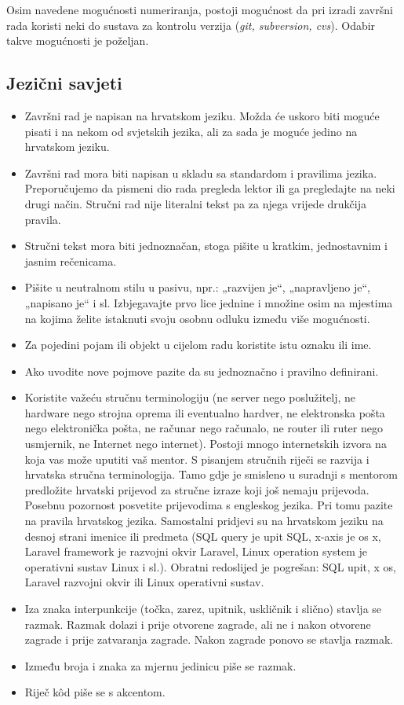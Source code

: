 Osim navedene mogućnosti numeriranja, postoji mogućnost da pri izradi završni rada koristi neki do sustava za kontrolu verzija (\textit{git, subversion, cvs}). Odabir takve mogućnosti je poželjan.

\subsection{Jezični savjeti}
\begin{itemize}
\item 
Završni rad je napisan na hrvatskom jeziku. Možda će uskoro biti moguće pisati i na nekom od svjetskih jezika, ali za sada je moguće jedino na hrvatskom jeziku.
\item Završni rad mora biti napisan u skladu sa standardom i pravilima jezika. Preporučujemo da pismeni dio rada pregleda lektor ili ga pregledajte na neki drugi način. Stručni rad nije literalni tekst pa za njega vrijede drukčija pravila.
\item Stručni tekst mora biti jednoznačan, stoga pišite u kratkim, jednostavnim i jasnim rečenicama.
\item Pišite u neutralnom stilu u pasivu, npr.: „razvijen je“, „napravljeno je“, „napisano je“ i sl. Izbjegavajte prvo lice jednine i množine osim na mjestima na kojima želite istaknuti svoju osobnu odluku između više mogućnosti. 
\item Za pojedini pojam ili objekt u cijelom radu koristite istu oznaku ili ime.
\item Ako uvodite nove pojmove pazite da su jednoznačno i pravilno definirani.
\item Koristite važeću stručnu terminologiju (ne server nego poslužitelj, ne hardware nego strojna oprema ili eventualno hardver, ne elektronska pošta nego elektronička pošta, ne računar nego računalo, ne router ili ruter nego usmjernik, ne Internet nego internet). Postoji mnogo internetskih izvora na koja vas može uputiti vaš mentor.
S pisanjem stručnih riječi se razvija i hrvatska stručna terminologija. Tamo gdje je smisleno u suradnji s mentorom predložite hrvatski prijevod za stručne izraze koji još nemaju prijevoda.
Posebnu pozornost posvetite prijevodima s engleskog jezika. Pri tomu pazite na pravila hrvatskog jezika. Samostalni pridjevi su na hrvatskom jeziku na desnoj strani imenice ili predmeta (SQL query je upit SQL, x-axis je os x, Laravel framework je razvojni okvir Laravel, Linux operation system je operativni sustav Linux i sl.). Obratni redoslijed je pogrešan: SQL upit, x os, Laravel razvojni okvir ili Linux operativni sustav.

\item Iza znaka interpunkcije (točka, zarez, upitnik, uskličnik i slično) stavlja se razmak. Razmak dolazi i prije otvorene zagrade, ali ne i nakon otvorene zagrade i prije zatvaranja zagrade. 
Nakon zagrade ponovo se stavlja razmak.

\item Između broja i znaka za mjernu jedinicu piše se razmak.

\item Riječ k\^od piše se s akcentom.                               
\end{itemize}
